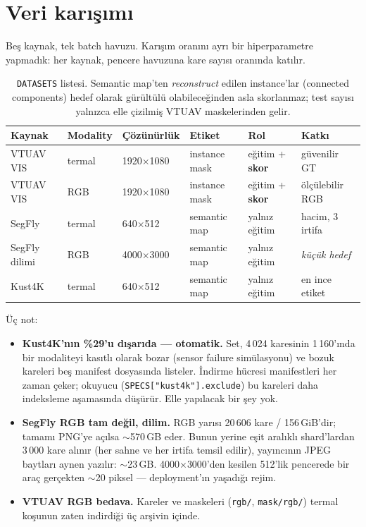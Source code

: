 \documentclass[11pt, paper=a4, DIV=14, parskip=half, numbers=noenddot]{scrartcl}
\newcommand{\code}[1]{\texttt{\small #1}}
\begin{document}
\section{Veri karışımı}

Beş kaynak, tek batch havuzu. Karışım oranını ayrı bir hiperparametre
yapmadık: her kaynak, pencere havuzuna kare sayısı oranında katılır.

\begin{table}[H]
\centering\small
\begin{tabular}{@{}llllll@{}}
\toprule
Kaynak & Modality & Çözünürlük & Etiket & Rol & Katkı \\
\midrule
VTUAV VIS      & termal & 1920$\times$1080 & instance mask & eğitim + \textbf{skor} & güvenilir GT \\
VTUAV VIS      & RGB    & 1920$\times$1080 & instance mask & eğitim + \textbf{skor} & ölçülebilir RGB \\
SegFly         & termal & 640$\times$512   & semantic map  & yalnız eğitim & hacim, 3 irtifa \\
SegFly dilimi  & RGB    & 4000$\times$3000 & semantic map  & yalnız eğitim & \emph{küçük hedef} \\
Kust4K         & termal & 640$\times$512   & semantic map  & yalnız eğitim & en ince etiket \\
\bottomrule
\end{tabular}
\caption{\code{DATASETS} listesi. Semantic map'ten \emph{reconstruct} edilen
instance'lar (connected components) hedef olarak gürültülü olabileceğinden
asla skorlanmaz; test sayısı yalnızca elle çizilmiş VTUAV maskelerinden
gelir.}
\end{table}

Üç not:

\begin{itemize}\itemsep2pt
  \item \textbf{Kust4K'nın \%29'u dışarıda --- otomatik.} Set, 4\,024
        karesinin 1\,160'ında bir modaliteyi kasıtlı olarak bozar (sensor
        failure simülasyonu) ve bozuk kareleri beş manifest dosyasında
        listeler. İndirme hücresi manifestleri her zaman çeker; okuyucu
        (\code{SPECS["kust4k"].exclude}) bu kareleri daha indeksleme
        aşamasında düşürür. Elle yapılacak bir şey yok.
  \item \textbf{SegFly RGB tam değil, dilim.} RGB yarısı 20\,606 kare /
        156\,GiB'dir; tamamı PNG'ye açılsa $\sim$570\,GB eder. Bunun yerine
        eşit aralıklı shard'lardan 3\,000 kare alınır (her sahne ve her
        irtifa temsil edilir), yayıncının JPEG baytları aynen yazılır:
        $\sim$23\,GB. 4000$\times$3000'den kesilen 512'lik pencerede bir
        araç gerçekten $\sim$20 piksel --- deployment'ın yaşadığı rejim.
  \item \textbf{VTUAV RGB bedava.} Kareler ve maskeleri (\code{rgb/},
        \code{mask/rgb/}) termal koşunun zaten indirdiği üç arşivin içinde.
\end{itemize}
\end{document}
